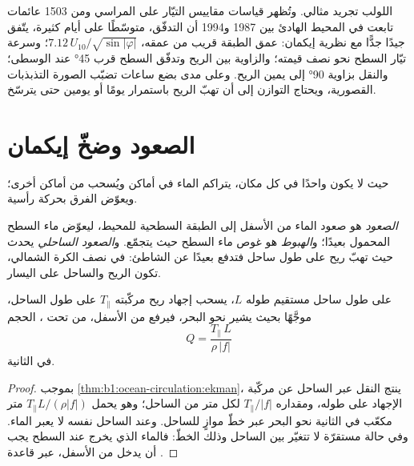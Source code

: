 اللولب تجريد مثالي. وتُظهر قياسات مقاييس التيّار على المراسي ومن \num{1503} عائمات تابعت في المحيط الهادئ بين 1987 و\num{1994} أن التدفّق، متوسّطًا على أيام كثيرة، يتّفق جيدًا جدًّا مع نظرية إيكمان: عمق الطبقة قريب من عمقه، $7.12\,U_{10}/\sqrt{\sin|\varphi|}$؛ وسرعة تيّار السطح نحو نصف قيمته؛ والزاوية بين الريح وتدفّق السطح قرب \ang{45} عند  الوسطى؛ والنقل بزاوية \ang{90} إلى يمين الريح. وعلى مدى بضع ساعات تضبّب الصورة التذبذبات القصورية، ويحتاج التوازن إلى أن تهبّ الريح باستمرار يومًا أو يومين حتى يترسّخ.

\section{الصعود وضخّ إيكمان}\label{sec:b1:ocean-circulation:upwelling}

حيث لا يكون  واحدًا في كل مكان، يتراكم الماء في أماكن ويُسحب من أماكن أخرى؛ ويعوّض الفرق بحركة رأسية.

\begin{definition}\label{def:b1:ocean-circulation:upwelling}
\emph{الصعود} هو صعود الماء من الأسفل إلى الطبقة السطحية للمحيط، ليعوّض ماء السطح المحمول بعيدًا؛ و\emph{الهبوط}%
 هو غوص ماء السطح حيث يتجمّع. و\emph{الصعود الساحلي} يحدث حيث تهبّ ريح على طول ساحل فتدفع  بعيدًا عن الشاطئ: في نصف الكرة الشمالي، تكون الريح والساحل على اليسار.
\end{definition}

\begin{proposition}\label{prop:b1:ocean-circulation:coastal}
على طول ساحل مستقيم طوله $L$، يسحب إجهاد ريح مركّبته $T_\parallel$ على طول الساحل، موجَّهًا بحيث يشير  نحو البحر، فيرفع من الأسفل، من تحت ، الحجم
\[
  Q = \frac{T_\parallel\,L}{\rho\,|f|}
\]
في الثانية.
\end{proposition}

\begin{proof}
بموجب \cref{thm:b1:ocean-circulation:ekman}، ينتج النقل عبر الساحل عن مركّبة الإجهاد على طوله، ومقداره $T_\parallel/|f|$ لكل متر من الساحل؛ وهو يحمل $T_\parallel L/(\rho|f|)$ متر مكعّب في الثانية نحو البحر عبر خطّ موازٍ للساحل. وعند الساحل نفسه لا يعبر الماء. وفي حالة مستقرّة لا تتغيّر  بين الساحل وذلك الخطّ: فالماء الذي يخرج عند السطح يجب أن يدخل من الأسفل، عبر قاعدة .
\end{proof}

